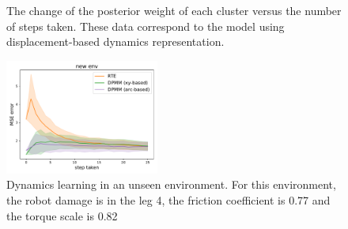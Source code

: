 \begin{figure}[!t]
\centering
{}
{}
\caption{The change of the posterior weight of each cluster versus the number of steps taken.
These data correspond to the model using displacement-based dynamics representation.
}
\label{weights}
\end{figure}

\begin{figure}[h]
\centering
\includegraphics[width=0.45\textwidth]{regular_case4.pdf}
\caption{Dynamics learning in an unseen environment.
For this environment, the robot damage is in the leg 4, the friction coefficient is 0.77 and the torque scale is 0.82}
\label{new_env}
\end{figure}


